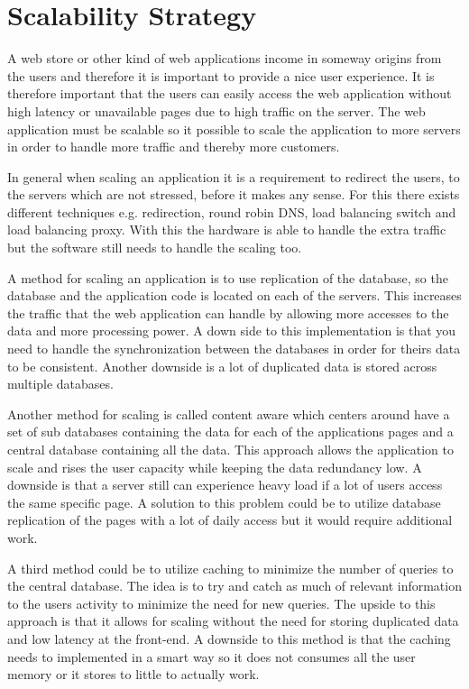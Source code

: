 \section{Scalability Strategy}
A web store or other kind of web applications income in someway origins from the users and therefore it is important to provide a nice user experience. It is therefore important that the users can easily access the web application without high latency or unavailable pages due to high traffic on the server. The web application must be scalable so it possible to scale the application to more servers in order to handle more traffic and thereby more customers.

In general when scaling an application it is a requirement to redirect the users, to the servers which are not stressed, before it makes any sense. For this there exists different techniques e.g. redirection, round robin DNS, load balancing switch and load balancing proxy. With this the hardware is able to handle the extra traffic but the software still needs to handle the scaling too.

A method for scaling an application is to use replication of the database, so the database and the application code is located on each of the servers. This increases the traffic that the web application can handle by allowing more accesses to the data and more processing power. A down side to this implementation is that you need to handle the synchronization between the databases in order for theirs data to be consistent. Another downside is a lot of duplicated data is stored across multiple databases.

Another method for scaling is called content aware which centers around have a set of sub databases containing the data for each of the applications pages and a central database containing all the data. This approach allows the application to scale and rises the user capacity while keeping the data redundancy low. A downside is that a server still can experience heavy load if a lot of users access the same specific page. A solution to this problem could be to utilize database replication of the pages with a lot of daily access but it would require additional work.

A third method could be to utilize caching to minimize the number of queries to the central database. The idea is to try and catch as much of relevant information to the users activity to minimize the need for new queries. The upside to this approach is that it allows for scaling without the need for storing duplicated data and low latency at the front-end. A downside to this method is that the caching needs to implemented in a smart way so it does not consumes all the user memory or it stores to little to actually work.

